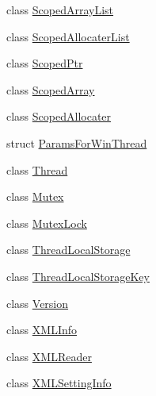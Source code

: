 \begin{DoxyCompactItemize}
\item 
class \hyperlink{classmocha_1_1_scoped_array_list}{ScopedArrayList}
\item 
class \hyperlink{classmocha_1_1_scoped_allocater_list}{ScopedAllocaterList}
\item 
class \hyperlink{classmocha_1_1_scoped_ptr}{ScopedPtr}
\item 
class \hyperlink{classmocha_1_1_scoped_array}{ScopedArray}
\item 
class \hyperlink{classmocha_1_1_scoped_allocater}{ScopedAllocater}
\item 
struct \hyperlink{structmocha_1_1_params_for_win_thread}{ParamsForWinThread}
\item 
class \hyperlink{classmocha_1_1_thread}{Thread}
\item 
class \hyperlink{classmocha_1_1_mutex}{Mutex}
\item 
class \hyperlink{classmocha_1_1_mutex_lock}{MutexLock}
\item 
class \hyperlink{classmocha_1_1_thread_local_storage}{ThreadLocalStorage}
\item 
class \hyperlink{classmocha_1_1_thread_local_storage_key}{ThreadLocalStorageKey}
\item 
class \hyperlink{classmocha_1_1_version}{Version}
\item 
class \hyperlink{classmocha_1_1_x_m_l_info}{XMLInfo}
\item 
class \hyperlink{classmocha_1_1_x_m_l_reader}{XMLReader}
\item 
class \hyperlink{classmocha_1_1_x_m_l_setting_info}{XMLSettingInfo}
\end{DoxyCompactItemize}
